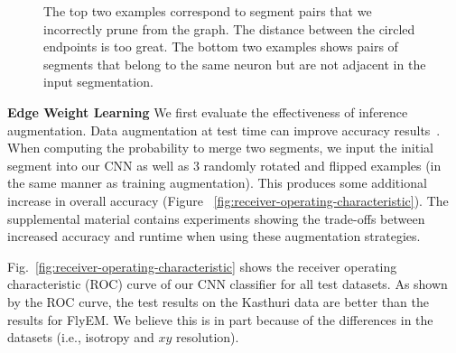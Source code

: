 \begin{figure}[t!]
\begin{minipage}{0.45\linewidth}
	\end{minipage}
	\caption{The top two examples correspond to segment pairs that we incorrectly prune from the graph. The distance between the circled endpoints is too great. The bottom two examples shows pairs of segments that belong to the same neuron but are not adjacent in the input segmentation.}
	\label{fig:skeleton-results}
\end{figure}

\noindent\textbf{Edge Weight Learning}
We first evaluate the effectiveness of inference augmentation.
Data augmentation at test time can improve accuracy results~\cite{zeng2017deepem3d,lee2017superhuman}.
When computing the probability to merge two segments, we input the initial segment into our CNN as well as 3 randomly rotated and flipped examples (in the same manner as training augmentation).
This produces some additional increase in overall accuracy (Figure ~\ref{fig:receiver-operating-characteristic}).
The supplemental material contains experiments showing the trade-offs between increased accuracy and runtime when using these augmentation strategies.

Fig.~\ref{fig:receiver-operating-characteristic} shows the receiver operating characteristic (ROC) curve of our CNN classifier for all test datasets.
As shown by the ROC curve, the test results on the Kasthuri data are better than the results for FlyEM.
We believe this is in part because of the differences in the datasets (i.e., isotropy and $xy$ resolution).



